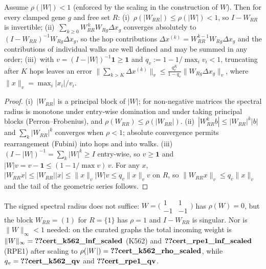 \begin{theorem}\label{thm:neumann}
Assume $\rho(|W|)<1$ (enforced by the scaling in the construction of $W$). Then for every clamped gene $g$ and free set $R$: (i)~$\rho(|W_{RR}|)\le\rho(|W|)<1$, so $I-W_{RR}$ is invertible; (ii)~$\sum_{k\ge0}W_{RR}^{\,k}W_{Rg}\Delta x_g$ converges absolutely to $(I-W_{RR})^{-1}W_{Rg}\Delta x_g$, so the hop contributions $\Delta x^{(k)}=W_{RR}^{k-1}W_{Rg}\Delta x_g$ and the contributions of individual walks are well defined and may be summed in any order; (iii)~with $v=(I-|W|)^{-1}\mathbf 1\ge\mathbf 1$ and $q_v:=1-1/\max_iv_i<1$, truncating after $K$ hops leaves an error $\|\sum_{k>K}\Delta x^{(k)}\|_v\le\frac{q_v^{K}}{1-q_v}\|W_{Rg}\Delta x_g\|_v$, where $\|x\|_v=\max_i|x_i|/v_i$.
\end{theorem}
\begin{proof}
(i)~$|W_{RR}|$ is a principal block of $|W|$; for non-negative matrices the spectral radius is monotone under entry-wise domination and under taking principal blocks (Perron--Frobenius), and $\rho(W_{RR})\le\rho(|W_{RR}|)$. (ii)~$|W_{RR}^kb|\le|W_{RR}|^k|b|$ and $\sum_k|W_{RR}|^k$ converges when $\rho<1$; absolute convergence permits rearrangement (Fubini) into hops and into walks. (iii)~$(I-|W|)^{-1}=\sum_k|W|^k\ge I$ entry-wise, so $v\ge\mathbf 1$ and $|W|v=v-\mathbf 1\le(1-1/\max v)\,v$. For any $x$, $|W_{RR}x|\le|W_{RR}||x|\le\|x\|_v|W|v\le q_v\|x\|_vv$ on $R$, so $\|W_{RR}x\|_v\le q_v\|x\|_v$ and the tail of the geometric series follows.
\end{proof}
\begin{remark}
The signed spectral radius does not suffice: $W=\bigl(\begin{smallmatrix}1&1\\-1&-1\end{smallmatrix}\bigr)$ has $\rho(W)=0$, but the block $W_{RR}=(1)$ for $R=\{1\}$ has $\rho=1$ and $I-W_{RR}$ is singular. Nor is $\|W\|_\infty<1$ needed: on the curated graphs the total incoming weight is $\|W\|_\infty=\datanum{cert_k562_inf_scaled}$ (K562) and $\datanum{cert_rpe1_inf_scaled}$ (RPE1) after scaling to $\rho(|W|)=\datanum{cert_k562_rho_scaled}$, while $q_v=\datanum{cert_k562_qv}$ and $\datanum{cert_rpe1_qv}$.
\end{remark}

